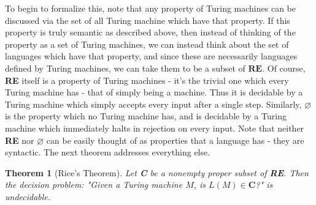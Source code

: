 \documentclass{article}
\theoremstyle{definition}
\theoremstyle{plain}
\theoremstyle{theorem}
\newtheorem{theorem}{Theorem}[section]
\begin{document}
\par To begin to formalize this, note that any property of Turing machines can be discussed via the set of all Turing machine which have that property. If this property is truly semantic as described above, then instead of thinking of the property as a set of Turing machines, we can instead think about the set of languages which have that property, and since these are necessarily languages defined by Turing machines, we can take them to be a subset of $\textbf{RE}$. Of course, \textbf{RE} itself is a property of Turing machines - it's the trivial one which every Turing machine has - that of simply being a machine. Thus it is decidable by a Turing machine which simply accepts every input after a single step. Similarly, $\varnothing$ is the property which no Turing machine has, and is decidable by a Turing machine which immediately halts in rejection on every input. Note that neither \textbf{RE} nor $\varnothing$ can be easily thought of as properties that a language has - they are syntactic. The next theorem addresses everything else.
\begin{theorem}[Rice's Theorem]
    Let \textbf{C} be a nonempty proper subset of \textbf{RE}. Then the decision problem: "Given a Turing machine $M$, is $L(M) \in \textbf{C}$?" is undecidable.
\end{theorem}
\end{document}
